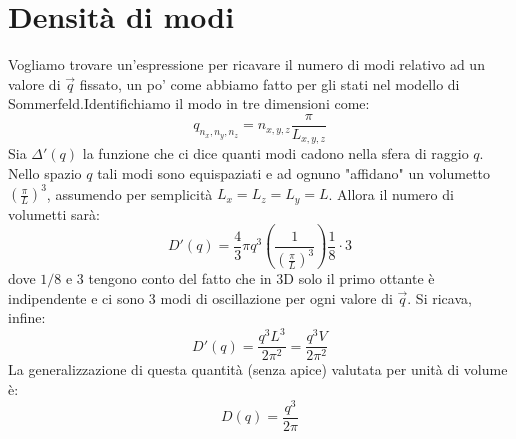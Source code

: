 \documentclass{book}
\begin{document}
    \section{Densità di modi}
            Vogliamo trovare un'espressione per ricavare il numero di modi relativo ad un valore di $\vec{q}$ fissato, un po' come abbiamo fatto per gli stati nel modello di Sommerfeld.Identifichiamo il modo in tre dimensioni come:
            $$q_{n_{x},n_{y},n_{z}} = n_{x,y,z}\frac{\pi}{L_{x,y,z}}$$
            Sia $\Delta ' (q)$ la funzione che ci dice quanti modi cadono nella sfera di raggio $q$. Nello spazio $q$ tali modi sono equispaziati e ad ognuno "affidano" un volumetto $ \displaystyle (\frac{\pi}{L})^{3}$, assumendo per semplicità $L_{x}=L_{z}=L_{y} = L$.
            Allora il numero di volumetti sarà:
            $$D '(q) = \frac{4}{3} \pi q^{3} (\frac{1}{(\frac{\pi}{L})^{3}}) \frac{1}{8} \cdot 3$$
            dove $1/8$ e $3$ tengono conto del fatto che in 3D solo il primo ottante è indipendente e ci sono 3 modi di oscillazione per ogni valore di $\vec{q}$.
            Si ricava, infine:
            $$D ' (q) = \frac{q^{3}L^{3}}{2 \pi^{2}} = \frac{q^{3}V}{2 \pi^{2}}$$
            La generalizzazione di questa quantità (senza apice) valutata per unità di volume è:
            $$D(q) = \frac{q^{3}}{2 \pi}$$
\end{document}
